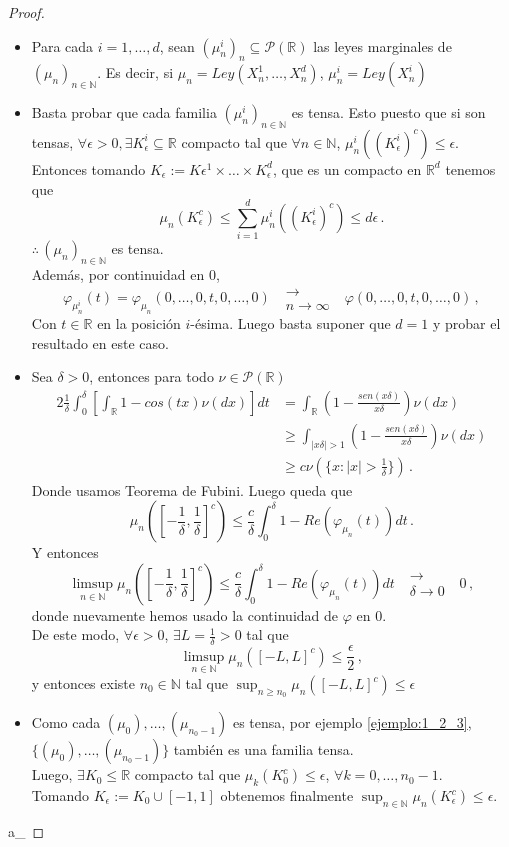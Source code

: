 \documentclass[letterpaper,11pt]{article} %
\theoremstyle{defbreak}
\theoremstyle{propbreak}
\theoremstyle{remark}
\theoremstyle{break}
\def\R{\mathbb{R}}
\def\N{\mathbb{N}}
\def\conv{\mbox{ }\substack{\longrightarrow \\ n\to\infty}\mbox{ }}
\def\beforeitemize{\leavevmode \vspace{-0.5\baselineskip}}
\def\gris{\color{mygray}}
\def\negro{\color{black}}
\def\findem{\null\hfill\color{white}a\color{black}_\square}
\begin{document}
\begin{proof}
\gris
\beforeitemize
\begin{itemize}
    \item Para cada $i=1,\dots,d$, sean $(\mu_n^i)_n\subseteq \mathcal{P}(\R)$ las leyes marginales de $(\mu_n)_{n\in\N}$. Es decir, si $\mu_n=Ley(X_n^1,\dots,X_n^d)$, $\mu_n^i=Ley(X_n^i)$
    \item Basta probar que cada familia $(\mu_n^i)_{n\in\N}$ es tensa.
    Esto puesto que si son tensas, $\forall \epsilon>0, \exists K_\epsilon^i\subseteq\R$ compacto tal que $\forall n\in\N$, $\mu_n^i((K_\epsilon^i)^c)\leq\epsilon$. Entonces tomando $K_\epsilon:=K\epsilon^1\times\dots\times K_\epsilon^d$, que es un compacto en $\R^d$ tenemos que
    $$ \mu_n(K^c_\epsilon)\leq \displaystyle\sum^d_{i=1}\mu_n^i((K_\epsilon^i)^c)\leq d \epsilon \, .$$
    $\therefore \, (\mu_n)_{n\in\N}$ es tensa. 
    \\ Además, por continuidad en $0$, $$\varphi_{\mu_n^i}(t)=\varphi_{\mu_n}(0,\dots,0,t,0,\dots,0)\conv \varphi(0,\dots,0,t,0,\dots,0)\, ,$$
    Con $t\in\R$ en la posición $i$-ésima. Luego basta suponer que $d=1$ y probar el resultado en este caso.
    \item Sea $\delta>0$, entonces para todo $\nu\in\mathcal{P}(\R)$
    \begin{alignat*}{2}
        \displaystyle \frac{1}{\delta}\int^\delta_0 [\int_\R 1-cos(tx)\nu(dx)]dt & = \int_\R(1-\frac{sen(x\delta)}{x\delta})\nu(dx) \\
         & \geq  \int_{|x\delta|>1}(1-\frac{sen(x\delta)}{x\delta})\nu(dx) \\
         & \geq c\nu(\{x:|x|>\frac{1}{\delta}\}) \, .
    \end{alignat*}
    Donde usamos Teorema de Fubini. Luego queda que
    $$ \displaystyle \mu_n([-\frac{1}{\delta},\frac{1}{\delta}]^c)\leq \frac{c}{\delta}\int^\delta_0 1-Re(\varphi_{\mu_n}(t))dt \, .$$
    Y entonces
    $$ \displaystyle \limsup_{n\in\N} \mu_n([-\frac{1}{\delta},\frac{1}{\delta}]^c)\leq \frac{c}{\delta}\int^\delta_0 1-Re(\varphi_{\mu_n}(t))dt\mbox{ }\substack{\longrightarrow \\ \delta\to0}\mbox{ }0 \, ,$$
    donde nuevamente hemos usado la continuidad de $\varphi$ en $0$.
    \\ De este modo, $\forall \epsilon>0$, $\exists L=\frac{1}{\delta}>0$ tal que 
    $$ \limsup_{n\in\N} \mu_n([-L,L]^c)\leq \frac{\epsilon}{2} \, ,$$
    y entonces existe $n_0\in\N$ tal que $\displaystyle \sup_{n\geq n_0}\mu_n([-L,L]^c)\leq \epsilon$
    \item Como cada $(\mu_0),\dots,(\mu_{n_0-1})$ es tensa, por ejemplo \ref{ejemplo:1_2_3}, $\{(\mu_0),\dots,(\mu_{n_0-1})\}$ también es una familia tensa.
    \\ Luego, $\exists K_0\leq \R$ compacto tal que $\mu_k(K_0^c)\leq\epsilon$, $\forall k = 0,\dots,n_0-1$.
    \\ Tomando $K_\epsilon:=K_0\cup [-1,1]$ obtenemos finalmente $\displaystyle\sup_{n\in\N}\mu_n(K_\epsilon^c)\leq \epsilon$.
\end{itemize}
\findem
\negro
\end{proof}
\end{document}
